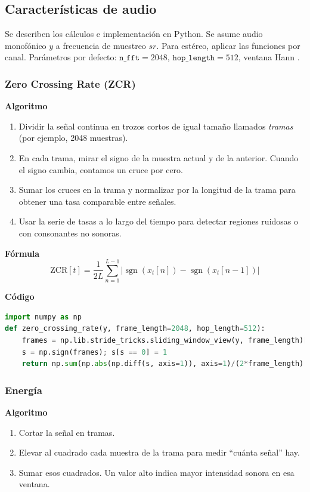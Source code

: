 

\subsection{Características de audio}
Se describen los cálculos e implementación en Python. Se asume audio monofónico \(y\) a frecuencia de muestreo \(sr\). Para estéreo, aplicar las funciones por canal. Parámetros por defecto: \(\texttt{n\_fft}=2048\), \(\texttt{hop\_length}=512\), ventana Hann \parencite{mcfee2015librosa}.

\subsubsection{Zero Crossing Rate (ZCR)}
\textbf{Algoritmo} \parencite{rabiner2011tasdp, tzanetakis2002musical}
\begin{enumerate}
  \item Dividir la señal continua en trozos cortos de igual tamaño llamados \emph{tramas} (por ejemplo, 2048 muestras).
  \item En cada trama, mirar el signo de la muestra actual y de la anterior. Cuando el signo cambia, contamos un cruce por cero.
  \item Sumar los cruces en la trama y normalizar por la longitud de la trama para obtener una tasa comparable entre señales.
  \item Usar la serie de tasas a lo largo del tiempo para detectar regiones ruidosas o con consonantes no sonoras.
\end{enumerate}

\textbf{Fórmula}
\[
  \text{ZCR}[t]=\frac{1}{2L}\sum_{n=1}^{L-1}\big|\operatorname{sgn}(x_t[n])-\operatorname{sgn}(x_t[n-1])\big|
\]

\textbf{Código}
\begin{lstlisting}[language=Python, label={lst:zcr_code}, caption={ZCR por tramas}]
import numpy as np
def zero_crossing_rate(y, frame_length=2048, hop_length=512):
    frames = np.lib.stride_tricks.sliding_window_view(y, frame_length)[::hop_length]
    s = np.sign(frames); s[s == 0] = 1
    return np.sum(np.abs(np.diff(s, axis=1)), axis=1)/(2*frame_length)
\end{lstlisting}

\subsubsection{Energía}
\textbf{Algoritmo} \parencite{giannakopoulos2014intro, muller2015fmp}
\begin{enumerate}
  \item Cortar la señal en tramas.
  \item Elevar al cuadrado cada muestra de la trama para medir “cuánta señal” hay.
  \item Sumar esos cuadrados. Un valor alto indica mayor intensidad sonora en esa ventana.
\end{enumerate}

